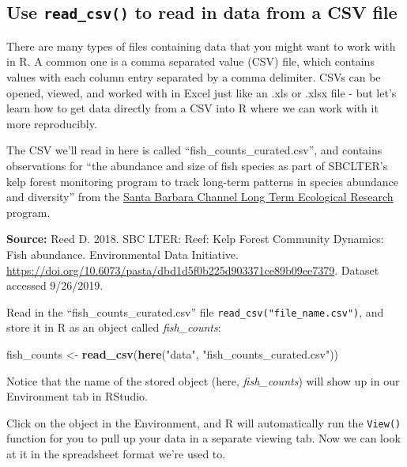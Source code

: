 \documentclass[]{book}
\newenvironment{Shaded}{\begin{snugshade}}{\end{snugshade}}
\newcommand{\KeywordTok}[1]{\textcolor[rgb]{0.13,0.29,0.53}{\textbf{#1}}}
\newcommand{\NormalTok}[1]{#1}
\newcommand{\StringTok}[1]{\textcolor[rgb]{0.31,0.60,0.02}{#1}}
\begin{document}
\hypertarget{use-read_csv-to-read-in-data-from-a-csv-file}{%
\subsection{\texorpdfstring{Use \texttt{read\_csv()} to read in data from a CSV file}{Use read\_csv() to read in data from a CSV file}}\label{use-read_csv-to-read-in-data-from-a-csv-file}}

There are many types of files containing data that you might want to work with in R. A common one is a comma separated value (CSV) file, which contains values with each column entry separated by a comma delimiter. CSVs can be opened, viewed, and worked with in Excel just like an .xls or .xlsx file - but let's learn how to get data directly from a CSV into R where we can work with it more reproducibly.

The CSV we'll read in here is called ``fish\_counts\_curated.csv'', and contains observations for ``the abundance and size of fish species as part of SBCLTER's kelp forest monitoring program to track long-term patterns in species abundance and diversity'' from the \href{http://sbc.lternet.edu/}{Santa Barbara Channel Long Term Ecological Research} program.

\textbf{Source:} Reed D. 2018. SBC LTER: Reef: Kelp Forest Community Dynamics: Fish abundance. Environmental Data Initiative. \url{https://doi.org/10.6073/pasta/dbd1d5f0b225d903371ce89b09ee7379}. Dataset accessed 9/26/2019.

Read in the ``fish\_counts\_curated.csv'' file \texttt{read\_csv("file\_name.csv")}, and store it in R as an object called \emph{fish\_counts}:

\begin{Shaded}
\begin{Highlighting}[]
\NormalTok{fish_counts <-}\StringTok{ }\KeywordTok{read_csv}\NormalTok{(}\KeywordTok{here}\NormalTok{(}\StringTok{"data"}\NormalTok{, }\StringTok{"fish_counts_curated.csv"}\NormalTok{))}
\end{Highlighting}
\end{Shaded}

Notice that the name of the stored object (here, \emph{fish\_counts}) will show up in our Environment tab in RStudio.

Click on the object in the Environment, and R will automatically run the \texttt{View()} function for you to pull up your data in a separate viewing tab. Now we can look at it in the spreadsheet format we're used to.
\end{document}
